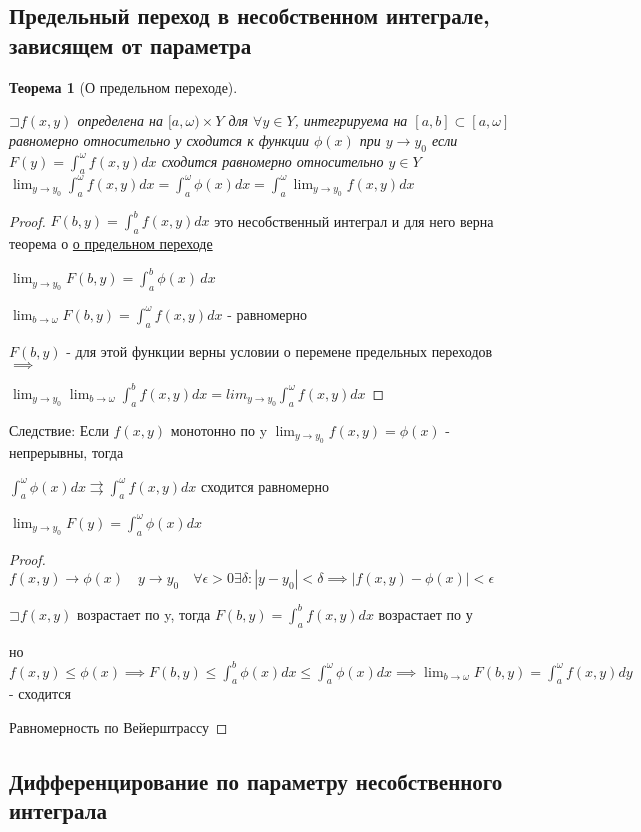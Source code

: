 \documentclass[a4paper]{article}
\newcommand\letsymbol{\mathord{\sqsupset}}
\newtheorem{theorem}{Теорема}[section]
\theoremstyle{definition}
\theoremstyle{remark}
\begin{document}
    \subsection{	Предельный переход в несобственном интеграле, зависящем от параметра}
    \begin{theorem}[О предельном переходе] \hypertarget{p4}{}
     $\letsymbol{}f(x,y)$ определена на $[a,\omega)\times Y$ для $\forall y\in Y$, интегрируема на $[a,b]\subset[a, \omega]$ равномерно относительно у сходится к функции $\phi(x)$ при $y\to y_0$ если $F(y) = \int_a^\omega f(x,y)dx$ 
     сходится равномерно относительно $y\in Y$
     $\lim_{y \to y_0}  \int_a^\omega  f(x,y)dx = \int_a^\omega  \phi(x)dx = \int_a^\omega  \lim_{y \to y_0}  f(x,y)dx$ 
\end{theorem}

\begin{proof}
     $F(b, y) = \int_a^b f(x,y)dx$ это несобственный интеграл и для него верна теорема о \hyperlink{p2}{о предельном переходе}

     $\lim_{y \to y_0}F(b, y) = \int_{a}^{b} \phi(x) \,dx $

     $\lim_{b\to \omega}F(b, y) = \int_a^\omega f(x,y)dx$ - равномерно

     $F(b,y)$ - для этой функции верны условии о перемене предельных переходов $\implies$

     $\lim_{y \to y_0} \lim_{b \to \omega} \int_a^b f(x,y)dx = lim_{y \to y_0} \int_a^\omega f(x,y)dx$
\end{proof}
Следствие:
Если $f(x,y)$ монотонно по y $\lim_{y \to y_0}  f(x,y) = \phi(x)$ - непрерывны, тогда

$\int_a^\omega \phi(x)dx\rightrightarrows\int_a^\omega f(x,y)dx$ сходится равномерно

$\lim_{y \to y_0} F(y) = \int_a^\omega \phi(x)dx$
\begin{proof}
     $f(x,y)\to \phi(x)\quad y\to y_0 \quad \forall\epsilon>0\exists\delta: |y - y_0|< \delta\implies |f(x,y) - \phi(x)|< \epsilon$

     $\letsymbol{} f(x,y)$ возрастает по y, тогда $F(b, y) = \int_a^b f(x,y)dx$ возрастает по у

     но $f(x,y)\leq\phi(x)\implies F(b, y)\leq \int_a^b \phi(x)dx \leq \int_a^\omega \phi(x)dx\implies \lim_{b \to \omega} F(b,y) = \int_a^\omega f(x,y)dy$ - сходится

     Равномерность по Вейерштрассу
\end{proof}
    \subsection{	Дифференцирование  по параметру несобственного интеграла}
\end{document}
